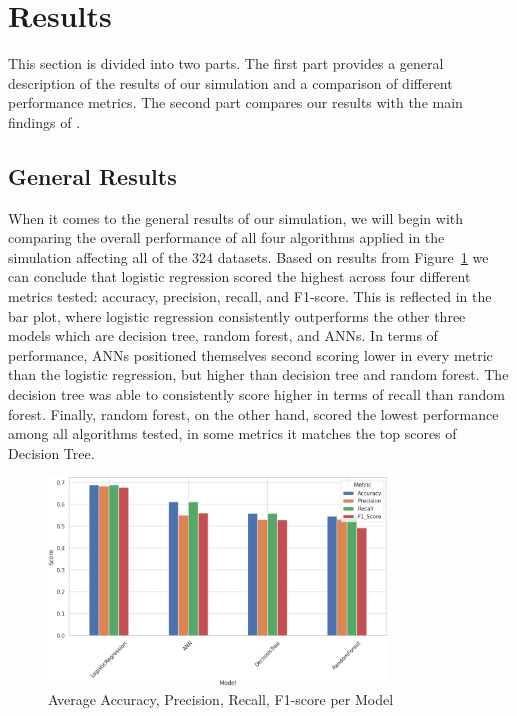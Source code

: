 \documentclass[12pt]{article}
\begin{document}
\section{Results}

This section is divided into two parts. The first part provides a general description of the results of our simulation and a comparison of different performance metrics. The second part compares our results with the main findings of \textcite{kim:10}.

\subsection{General Results}

When it comes to the general results of our simulation, we will begin with comparing the overall performance of all four algorithms applied in the simulation affecting all of the 324 datasets. Based on results from Figure~\ref{fig:metrics} we can conclude that logistic regression scored the highest across four different metrics tested: accuracy, precision, recall, and F1-score. This is reflected in the bar plot, where logistic regression consistently outperforms the other three models which are decision tree, random forest, and ANNs. In terms of performance, ANNs positioned themselves second scoring lower in every metric than the logistic regression, but higher than decision tree and random forest. The decision tree was able to consistently score higher in terms of recall than random forest. Finally, random forest, on the other hand, scored the lowest performance among all algorithms tested, in some metrics it matches the top scores of Decision Tree. 

\begin{figure}[h]
 \centering
    \includegraphics[width=0.8\textwidth]{fig/metics.png}
    \caption{Average Accuracy, Precision, Recall, F1-score per Model}
    \label{fig:metrics}
\end{figure}
\end{document}
